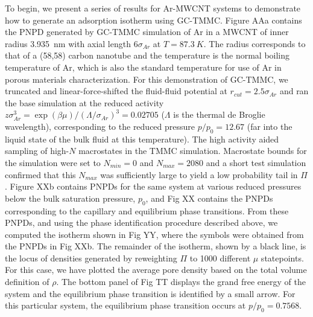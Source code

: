 %
To begin, we present a series of results for Ar-MWCNT systems to demonstrate how to generate an adsorption isotherm using GC-TMMC. Figure AAa contains the PNPD generated by GC-TMMC simulation of Ar in a MWCNT of inner radius 3.935~nm with axial length $6\sigma_{Ar}$ at $T = 87.3~K$. The radius corresponds to that of a (58,58) carbon nanotube\cite{Frey_Tubegen_2011} and the temperature is the normal boiling temperature of Ar, which is also the standard temperature for use of Ar in porous materials characterization\cite{Lowell_Characterization_2004}. For this demonstration of GC-TMMC, we truncated and linear-force-shifted the fluid-fluid potential at $r_{cut}=2.5\sigma_{Ar}$\cite{Allen_Computer_1987} and ran the base simulation at the reduced activity $z\sigma_{Ar}^3 = \exp\left(\beta \mu\right)/\left(\Lambda/\sigma_{Ar}\right)^3 = 0.02705$ ($\Lambda$ is the thermal de Broglie wavelength), corresponding to the reduced pressure $p/p_0 = 12.67$ (far into the liquid state of the bulk fluid at this temperature). The high activity aided sampling of high-$N$ macrostates in the TMMC simulation. Macrostate bounds for the simulation were set to $N_{min} = 0$ and $N_{max} = 2080$ and a short test simulation confirmed that this $N_{max}$ was sufficiently large to yield a low probability tail in $\Pi$. Figure XXb contains PNPDs for the same system at various reduced pressures below the bulk saturation pressure, $p_0$, and Fig XX contains the PNPDs corresponding to the capillary and equilibrium phase transitions. From these PNPDs, and using the phase identification procedure described above, we computed the isotherm shown in Fig YY, where the symbols were obtained from the PNPDs in Fig XXb. The remainder of the isotherm, shown by a black line, is the locus of densities generated by reweighting $\Pi$ to 1000 different $\mu$ statepoints. For this case, we have plotted the average pore density based on the total volume definition of $\rho$. The bottom panel of Fig TT displays the grand free energy of the system and the equilibrium phase transition is identified by a small arrow. For this particular system, the equilibrium phase transition occurs at $p/p_0 = 0.7568$.


